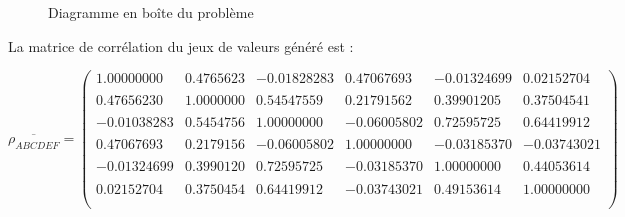 \documentclass[a4paper]{article}
\begin{document}
\begin{appendices}
\begin{figure}[H]
\hfill
{}
\caption{Diagramme en boîte du problème}\label{fig:somefiglabel}
\end{figure}

La matrice de corrélation du jeux de valeurs généré est :


$$\overline{\rho_{ABCDEF}}=\begin{pmatrix}
1.00000000 &0.4765623& -0.01828283&  0.47067693& -0.01324699 & 0.02152704\\ \\
0.47656230 &1.0000000  &0.54547559 & 0.21791562  &0.39901205  &0.37504541\\ \\
-0.01038283 &0.5454756  &1.00000000 &-0.06005802 & 0.72595725 & 0.64419912\\ \\
0.47067693 &0.2179156 &-0.06005802  &1.00000000 &-0.03185370 &-0.03743021\\ \\
 -0.01324699 &0.3990120 & 0.72595725& -0.03185370 & 1.00000000  &0.44053614\\ \\
 0.02152704 &0.3750454  &0.64419912 &-0.03743021  &0.49153614  &1.00000000\\ \\
\end{pmatrix}$$


\end{appendices}
\end{document}
